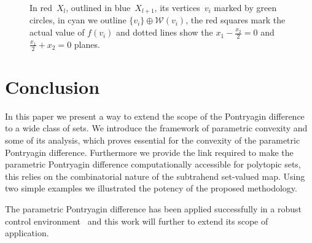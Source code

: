 \documentclass[a4paper, 12pt, twoside]{article}
\theoremstyle{definition}
\numberwithin{equation}{section}
\begin{document}
\begin{figure}
\caption{In red~$X_l$, outlined in blue~$X_{l+1}$, its vertices~$v_i$ marked by green circles, in cyan we outline $\{v_i\}\oplus\mathcal W(v_i)$, the red squares mark the actual value of $f(v_i)$ and dotted lines show the $x_1-\frac{x_2}{2}=0$ and $\frac{x_1}{2}+x_2=0$ planes.}
\label{fig:second:example:resulting:set}
\end{figure}
%
%
%
%
%
\section{Conclusion}\label{sec:conclusion}
%
%
%
In this paper we present a way to extend the scope of the Pontryagin difference to a wide class of sets.
%
We introduce the framework of parametric convexity and some of its analysis, which proves essential for the convexity of the parametric Pontryagin difference.
%
Furthermore we provide the link required to make the parametric Pontryagin difference computationally accessible for polytopic sets, this relies on the combinatorial nature of the subtrahend set-valued map.
%
Using two simple examples we illustrated the potency of the proposed methodology.

The parametric Pontryagin difference has been applied successfully in a robust control environment~\cite{Schaich:2015,Schaich:2015a} and this work will further to extend its scope of application.




\end{document}
